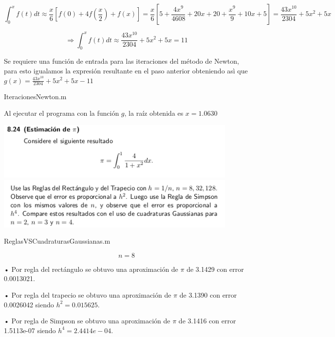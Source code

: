 \documentclass[11pt]{article}
\begin{document}
$$\int_{0}^{x} f(t)dt \approx \frac{x}{6}[f(0)+4f(\frac{x}{2})+f(x)] = \frac{x}{6}[5+\frac{4x^9}{4608}+20x+20+\frac{x^9}{9}+10x+5] 
= \frac{43x^{10}}{2304} + 5x^2+ 5x$$

$$\Rightarrow \int_{0}^{x} f(t)dt \approx  \frac{43x^{10}}{2304} + 5x^2+ 5x = 11 $$

Se requiere una función de entrada para las iteraciones del método de Newton, para esto igualamos la expresión resultante en el paso anterior obteniendo asì que $g(x) = \frac{43x^{10}}{2304} + 5x^2+ 5x - 11$

\begin{tcolorbox}[colframe=blue!35!black, title=Código]
    IteracionesNewton.m
\end{tcolorbox}

Al ejecutar el programa con la función $g$, la raíz obtenida es $x = 1.0630$

\vspace{0.5cm}
\begin{center}
    \includegraphics[keepaspectratio, width=12cm]{8.24.png}
    \includegraphics[keepaspectratio, width=12cm]{8.242.png}
    \caption{\\}
\end{center} 

\begin{tcolorbox}[colframe=blue!35!black, title=Código]
    ReglasVSCuadraturasGaussianas.m
\end{tcolorbox}

$$n = 8$$

• Por regla del rectángulo se obtuvo una aproximación de $\pi$ de 3.1429 con error 0.0013021.

• Por regla del trapecio se obtuvo una aproximación de $\pi$ de 3.1390 con error 0.0026042 siendo $h^2 = 0.015625$.

• Por regla de Simpson se obtuvo una aproximación de $\pi$ de 3.1416 con error 1.5113e-07 siendo $h^4 = 2.4414e-04$.
\end{document}
